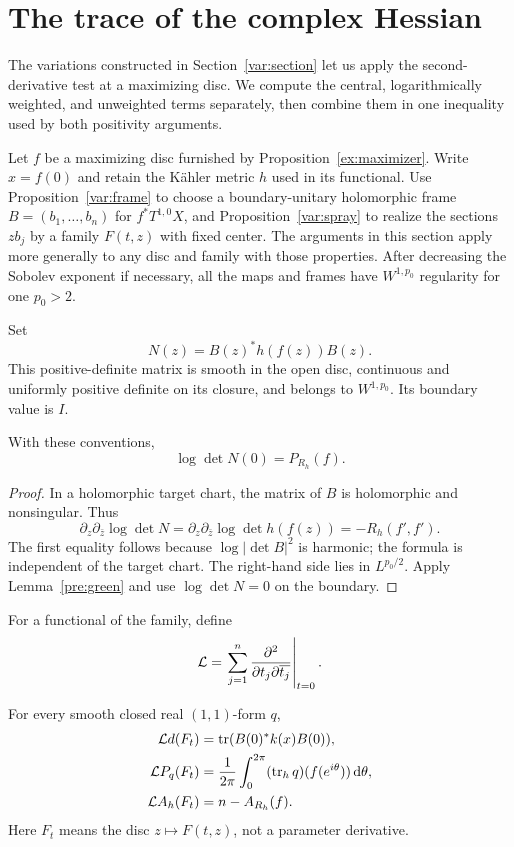\section{The trace of the complex Hessian}\label{sec:hessian}

The variations constructed in Section~\ref{var:section} let us apply
the second-derivative test at a maximizing disc. We compute the
central, logarithmically weighted, and unweighted terms separately,
then combine them in one inequality used by both positivity arguments.

Let $f$ be a maximizing disc furnished by Proposition~\ref{ex:maximizer}.
Write $x=f(0)$ and retain the K\"ahler metric $h$ used in its functional.
Use Proposition~\ref{var:frame} to choose a boundary-unitary holomorphic
frame $B=(b_1,\ldots,b_n)$ for $f^*T^{1,0}X$, and
Proposition~\ref{var:spray} to realize the sections $zb_j$ by a family
$F(t,z)$ with fixed center. The arguments in this section apply more
generally to any disc and family with those properties. After decreasing
the Sobolev exponent if necessary, all the maps and frames have
$W^{1,p_0}$ regularity for one $p_0>2$.

Set
\[
 N(z)=B(z)^*h(f(z))B(z).
\]
This positive-definite matrix is smooth in the open disc, continuous
and uniformly positive definite on its closure, and belongs to
$W^{1,p_0}$. Its boundary value is $I$.

\begin{lemma}\label{hes:determinant}
With these conventions,
\begin{equation}\label{eq:determinant-identity}
 \log\det N(0)=P_{R_h}(f).
\end{equation}
\end{lemma}

\begin{proof}
In a holomorphic target chart, the matrix of $B$ is holomorphic and
nonsingular. Thus
\[
 \partial_z\partial_{\bar z}\log\det N
 =\partial_z\partial_{\bar z}\log\det h(f(z))
 =-R_h(f',f').
\]
The first equality follows because $\log|\det B|^2$ is harmonic; the
formula is independent of the target chart. The right-hand side lies
in $L^{p_0/2}$. Apply Lemma~\ref{pre:green} and use
$\log\det N=0$ on the boundary.
\end{proof}

For a functional of the family, define
\[
 \mathcal L=\left.\sum_{j=1}^n
   \frac{\partial^2}{\partial t_j\partial\overline{t_j}}\right|_{t=0}.
\]

\begin{proposition}\label{hes:trace}
For every smooth closed real $(1,1)$-form $q$,
\begin{align}
 \mathcal L d(F_t)&=\operatorname{tr}(B(0)^*k(x)B(0)),\label{eq:hessian-central}\\
 \mathcal L P_q(F_t)&=\frac1{2\pi}\int_0^{2\pi}
      (\operatorname{tr}_h q)(f(e^{i\theta}))\,\mathrm d\theta,\label{eq:hessian-poisson}\\
 \mathcal L A_h(F_t)&=n-A_{R_h}(f).\label{eq:hessian-area}
\end{align}
Here $F_t$ means the disc $z\mapsto F(t,z)$, not a parameter derivative.
\end{proposition}

